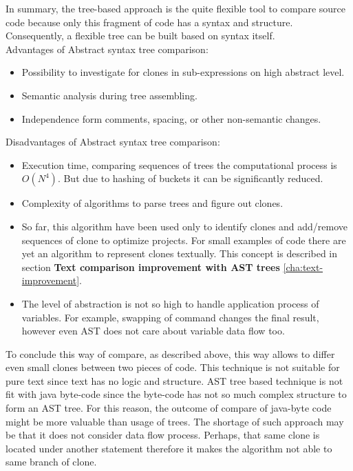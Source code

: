 \documentclass{report}
\begin{document}
In summary, the tree-based approach is the quite flexible tool to compare source code because only this fragment of code has a syntax and structure. Consequently, a flexible tree can be built based on syntax itself. \\
Advantages of Abstract syntax tree comparison:
\begin{itemize}
	\item Possibility to investigate for clones in sub-expressions on high abstract level.
	\item Semantic analysis during tree assembling.
	\item Independence form comments, spacing, or other non-semantic changes.
\end{itemize}
Disadvantages of Abstract syntax tree comparison:
\begin{itemize}
	\item Execution time, comparing sequences of trees the computational process is $O(N^4)$. But due to hashing of buckets it can be significantly reduced.
	\item Complexity of algorithms to parse trees and figure out clones.
	\item So far, this algorithm have been used only to identify clones and add/remove sequences of clone to optimize projects. For small examples of code there are yet an algorithm to represent clones textually. This concept is described in section \textbf{Text comparison improvement with AST trees} \ref{cha:text-improvement}.
	\item The level of abstraction is not so high to handle application process of variables. For example, swapping of command changes the final result, however even AST does not care about variable data flow too.
\end{itemize}
To conclude this way of compare, as described above, this way allows to differ even small clones between two pieces of code. This technique is not suitable for pure text since text has no logic and structure. AST tree based technique is not fit with java byte-code since the byte-code has not so much complex structure to form an AST tree. For this reason, the outcome of compare of java-byte code might be more valuable than usage of trees. The shortage of such approach may be that it does not consider data flow process. Perhaps, that same clone is located under another statement therefore it makes the algorithm not able to same branch of clone.
\end{document}
